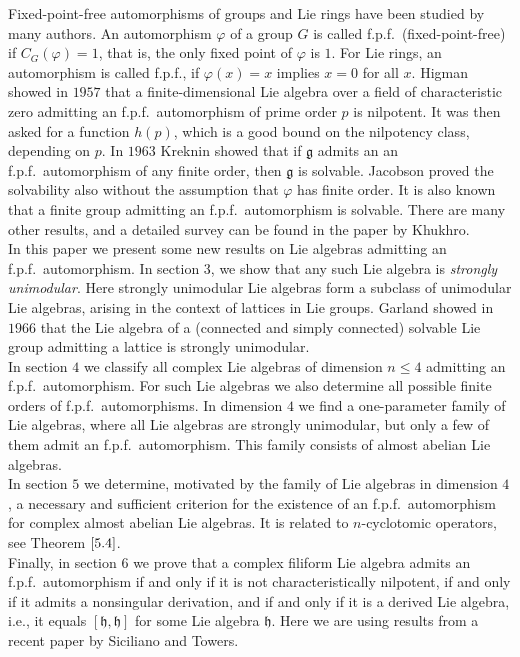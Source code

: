 \documentclass[12pt]{amsart}
\theoremstyle{definition}
\theoremstyle{remark}
\newcommand{\Lg}{\mathfrak{g}}
\newcommand{\Lh}{\mathfrak{h}}
\renewcommand{\phi}{\varphi}
\begin{document}
Fixed-point-free automorphisms of groups and Lie rings have been studied by many authors.
An automorphism $\phi$ of a group $G$ is called f.p.f.\ (fixed-point-free) if $C_G(\phi)=1$,
that is, the only fixed point of $\phi$ is $1$. For Lie rings, an automorphism is called f.p.f., if
$\phi(x)=x$ implies $x=0$ for all $x$.
Higman showed in $1957$ that a finite-dimensional Lie algebra over a field of characteristic zero
admitting an f.p.f.\ automorphism of prime order $p$ is nilpotent. It was then asked for a function $h(p)$,
which is a good bound on the nilpotency class, depending on $p$. 
In $1963$ Kreknin showed that if $\Lg$ admits an an f.p.f.\ automorphism of
any finite order, then $\Lg$ is solvable. Jacobson proved the solvability also without the assumption
that $\phi$ has finite order. It is also known that a finite group admitting an f.p.f.\ automorphism is solvable.
There are many other results, and a detailed survey can be found in the paper \cite{KHU} 
by Khukhro. \\[0.2cm]
In this paper we present some new results on Lie algebras admitting an f.p.f.\ automorphism. 
In section $3$, we show that any such Lie algebra is {\em strongly unimodular}. Here strongly unimodular Lie algebras
form a subclass of unimodular Lie algebras, arising in the context of lattices in Lie groups.
Garland showed in $1966$ that the Lie algebra of a (connected and simply connected) solvable Lie group admitting
a lattice is strongly unimodular. \\[0.2cm]
In section $4$ we classify all complex Lie algebras of dimension $n\le 4$ admitting an f.p.f.\ automorphism.
For such Lie algebras we also determine all possible finite orders of  f.p.f.\ automorphisms. In dimension $4$
we find a one-parameter family of Lie algebras, where all Lie algebras are strongly unimodular, but only
a few of them admit an f.p.f.\ automorphism. This family consists of almost abelian Lie algebras. \\[0.2cm]
In section $5$ we determine, motivated by the family of Lie algebras in dimension $4$, a necessary and sufficient
criterion for the existence of an f.p.f.\ automorphism for complex almost abelian Lie algebras.
It is related to $n$-cyclotomic operators, see Theorem $\ref{5.4}$. \\[0.2cm]
Finally, in section $6$ we prove that a complex filiform Lie algebra admits an f.p.f.\ automorphism if and only if it
is not characteristically nilpotent, if and only if it admits a nonsingular derivation, and if and only if it is a
derived Lie algebra, i.e., it equals $[\Lh,\Lh]$ for some Lie algebra $\Lh$. Here we are using results from a recent
paper \cite{SIT} by Siciliano and Towers.
\end{document}
